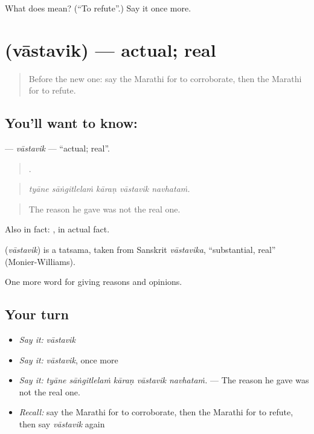 \begin{tcolorbox}[breakable,colback=teal!4,colframe=teal!35!black,title={Before you move on}]
What does   mean? (\textquotedblleft{}To refute\textquotedblright{}.) Say it once more.
\end{tcolorbox}
\section[\texorpdfstring{\mr{वास्तविक} (vāstavik)}{वास्तविक (vāstavik)}]{ (vāstavik) — actual; real}

\label{lesson:MR-C353-vastavik}



\begin{quote}
Before the new one: say the Marathi for to corroborate, then the Marathi for to refute.
\end{quote}

\subsection*{You'll want to know: }
\textbf{} — \emph{vāstavik} — \textquotedblleft{}actual; real\textquotedblright{}.

\begin{quote}
    .
\end{quote}

\begin{quote}
\emph{tyāne sāṅgitlelaṁ kāraṇ vāstavik navhataṁ.}
\end{quote}

\begin{quote}
The reason he gave was not the real one.
\end{quote}

Also in fact:  , in actual fact.

\begin{cousinweb}
\textbf{} (\emph{vāstavik}) is a tatsama, taken from Sanskrit \emph{vāstavika}, \textquotedblleft{}substantial, real\textquotedblright{} (Monier-Williams).
\end{cousinweb}

\begin{grammarlens}[title={What you've built}]
One more word for giving reasons and opinions.
\end{grammarlens}

\subsection*{Your turn}
\begin{itemize}
\raggedright
  \item \emph{Say it:} \emph{vāstavik}
  \item \emph{Say it:} \emph{vāstavik}, once more
  \item \emph{Say it:} \emph{tyāne sāṅgitlelaṁ kāraṇ vāstavik navhataṁ.} — The reason he gave was not the real one.
  \item \emph{Recall:} say the Marathi for to corroborate, then the Marathi for to refute, then say \emph{vāstavik} again
\end{itemize}

